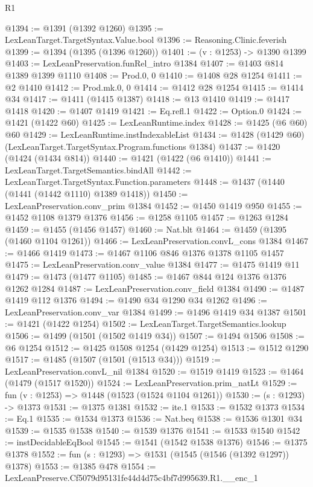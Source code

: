 \begin{lexlean}{R1}
\begin{coremodule}
@1394 := @1391 (@1392 @1260)
@1395 := LexLeanTarget.TargetSyntax.Value.bool
@1396 := Reasoning.Clinic.feverish
@1399 := @1394 (@1395 (@1396 @1260))
@1401 := (v : @1253) -> @1390 @1399
@1403 := LexLeanPreservation.funRel_intro @1384
@1407 := @1403 @814 @1389 @1399 @1110
@1408 := Prod.{0, 0}
@1410 := @1408 @28 @1254
@1411 := @2 @1410
@1412 := Prod.mk.{0, 0}
@1414 := @1412 @28 @1254
@1415 := @1414 @34
@1417 := @1411 (@1415 @1387)
@1418 := @13 @1410
@1419 := @1417 @1418
@1420 := @1407 @1419
@1421 := Eq.refl.{1}
@1422 := Option.{0}
@1424 := @1421 (@1422 @60)
@1425 := LexLeanRuntime.index
@1428 := @1425 (@6 @60) @60
@1429 := LexLeanRuntime.instIndexableList
@1434 := @1428 (@1429 @60) (LexLeanTarget.TargetSyntax.Program.functions @1384)
@1437 := @1420 (@1424 (@1434 @814))
@1440 := @1421 (@1422 (@6 @1410))
@1441 := LexLeanTarget.TargetSemantics.bindAll
@1442 := LexLeanTarget.TargetSyntax.Function.parameters
@1448 := @1437 (@1440 (@1441 (@1442 @1110) @1389 @1418))
@1450 := LexLeanPreservation.conv_prim @1384
@1452 := @1450 @1419 @950
@1455 := @1452 @1108 @1379 @1376
@1456 := @1258 @1105
@1457 := @1263 @1284
@1459 := @1455 (@1456 @1457)
@1460 := Nat.blt
@1464 := @1459 (@1395 (@1460 @1104 @1261))
@1466 := LexLeanPreservation.convL_cons @1384
@1467 := @1466 @1419
@1473 := @1467 @1106 @846 @1376 @1378 @1105 @1457
@1475 := LexLeanPreservation.conv_value @1384
@1477 := @1475 @1419 @11
@1479 := @1473 (@1477 @1105)
@1485 := @1467 @844 @124 @1376 @1376 @1262 @1284
@1487 := LexLeanPreservation.conv_field @1384
@1490 := @1487 @1419 @112 @1376
@1494 := @1490 @34 @1290 @34 @1262
@1496 := LexLeanPreservation.conv_var @1384
@1499 := @1496 @1419 @34 @1387
@1501 := @1421 (@1422 @1254)
@1502 := LexLeanTarget.TargetSemantics.lookup
@1506 := @1499 (@1501 (@1502 @1419 @34))
@1507 := @1494 @1506
@1508 := @6 @1254
@1512 := @1425 @1508 @1254 (@1429 @1254)
@1513 := @1512 @1290
@1517 := @1485 (@1507 (@1501 (@1513 @34)))
@1519 := LexLeanPreservation.convL_nil @1384
@1520 := @1519 @1419
@1523 := @1464 (@1479 (@1517 @1520))
@1524 := LexLeanPreservation.prim_natLt
@1529 := fun (v : @1253) => @1448 (@1523 (@1524 @1104 @1261))
@1530 := (s : @1293) -> @1373
@1531 := @1375 @1381
@1532 := ite.{1}
@1533 := @1532 @1373
@1534 := Eq.{1}
@1535 := @1534 @1373
@1536 := Nat.beq
@1538 := @1536 @1301 @34
@1539 := @1535 @1538
@1540 := @1539 @1376
@1541 := @1533 @1540
@1542 := instDecidableEqBool
@1545 := @1541 (@1542 @1538 @1376)
@1546 := @1375 @1378
@1552 := fun (s : @1293) => @1531 (@1545 (@1546 (@1392 @1297)) @1378)
@1553 := @1385 @478
@1554 := LexLeanPreserve.Cf5079d95131fe44d4d75c4bf7d995639.R1.__enc_1

\end{coremodule}
\end{lexlean}
